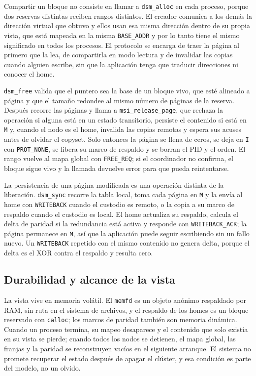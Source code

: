 Compartir un bloque no consiste en llamar a \texttt{dsm\_alloc} en cada proceso, porque dos reservas distintas reciben rangos distintos. El creador comunica a los demás la dirección virtual que obtuvo y ellos usan esa misma dirección dentro de su propia vista, que está mapeada en la misma \texttt{BASE\_ADDR} y por lo tanto tiene el mismo significado en todos los procesos. El protocolo se encarga de traer la página al primero que la lea, de compartirla en modo lectura y de invalidar las copias cuando alguien escribe, sin que la aplicación tenga que traducir direcciones ni conocer el home.

\texttt{dsm\_free} valida que el puntero sea la base de un bloque vivo, que esté alineado a página y que el tamaño redondee al mismo número de páginas de la reserva. Después recorre las páginas y llama a \texttt{msi\_release\_page}, que rechaza la operación si alguna está en un estado transitorio, persiste el contenido si está en \texttt{M} y, cuando el nodo es el home, invalida las copias remotas y espera sus acuses antes de olvidar el copyset. Solo entonces la página se llena de ceros, se deja en \texttt{I} con \texttt{PROT\_NONE}, se libera su marco de respaldo y se borran el PID y el orden. El rango vuelve al mapa global con \texttt{FREE\_REQ}; si el coordinador no confirma, el bloque sigue vivo y la llamada devuelve error para que pueda reintentarse.

La persistencia de una página modificada es una operación distinta de la liberación. \texttt{dsm\_sync} recorre la tabla local, toma cada página en \texttt{M} y la envía al home con \texttt{WRITEBACK} cuando el custodio es remoto, o la copia a su marco de respaldo cuando el custodio es local. El home actualiza su respaldo, calcula el delta de paridad si la redundancia está activa y responde con \texttt{WRITEBACK\_ACK}; la página permanece en \texttt{M}, así que la aplicación puede seguir escribiendo sin un fallo nuevo. Un \texttt{WRITEBACK} repetido con el mismo contenido no genera delta, porque el delta es el XOR contra el respaldo y resulta cero.

\subsection{Durabilidad y alcance de la vista}\label{sec:durabilidad}

La vista vive en memoria volátil. El \texttt{memfd} es un objeto anónimo respaldado por RAM, sin ruta en el sistema de archivos, y el respaldo de los homes es un bloque reservado con \texttt{calloc}; los marcos de paridad también son memoria dinámica. Cuando un proceso termina, su mapeo desaparece y el contenido que solo existía en su vista se pierde; cuando todos los nodos se detienen, el mapa global, las franjas y la paridad se reconstruyen vacíos en el siguiente arranque. El sistema no promete recuperar el estado después de apagar el clúster, y esa condición es parte del modelo, no un olvido.

